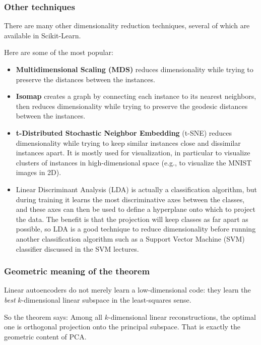 \documentclass{beamer}
\begin{document}
\begin{frame}
\frametitle{Other techniques}

There are many other dimensionality reduction techniques, several of which are available in Scikit-Learn.

Here are some of the most popular:
\begin{itemize}
\item \textbf{Multidimensional Scaling (MDS)} reduces dimensionality while trying to preserve the distances between the instances.

\item \textbf{Isomap} creates a graph by connecting each instance to its nearest neighbors, then reduces dimensionality while trying to preserve the geodesic distances between the instances.

\item \textbf{t-Distributed Stochastic Neighbor Embedding} (t-SNE) reduces dimensionality while trying to keep similar instances close and dissimilar instances apart. It is mostly used for visualization, in particular to visualize clusters of instances in high-dimensional space (e.g., to visualize the MNIST images in 2D).

\item Linear Discriminant Analysis (LDA) is actually a classification algorithm, but during training it learns the most discriminative axes between the classes, and these axes can then be used to define a hyperplane onto which to project the data. The benefit is that the projection will keep classes as far apart as possible, so LDA is a good technique to reduce dimensionality before running another classification algorithm such as a Support Vector Machine (SVM) classifier discussed in the SVM lectures.
\end{itemize}

\noindent
\end{frame}

\begin{frame}
\frametitle{Geometric meaning of the theorem}

Linear autoencoders do not merely learn a low-dimensional code:
they learn the \emph{best} \(k\)-dimensional linear subspace in the least-squares sense.

\begin{block}{So the theorem says: }
Among all \(k\)-dimensional linear reconstructions, the optimal one is orthogonal projection onto the principal subspace.
That is exactly the geometric content of PCA.
\end{block}
\end{frame}
\end{document}
